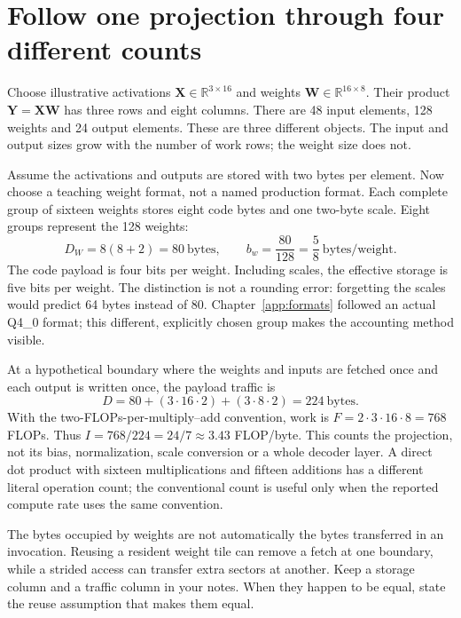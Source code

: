 \section{Follow one projection through four different counts}
Choose illustrative activations
$\mathbf X\in\mathbb R^{3\times16}$ and weights
$\mathbf W\in\mathbb R^{16\times8}$. Their product
$\mathbf Y=\mathbf X\mathbf W$ has three rows and eight columns.
There are 48 input elements, 128 weights and 24 output elements.
These are three different objects. The input and output sizes grow
with the number of work rows; the weight size does not.

Assume the activations and outputs are stored with two bytes per element.
Now choose a teaching weight format, not a named production format.
Each complete group of sixteen weights stores eight code bytes and
one two-byte scale. Eight groups represent the 128 weights:
\[
 D_W=8(8+2)=80\ \text{bytes},\qquad
 b_w=\frac{80}{128}=\frac58\ \text{bytes/weight}.
\]
The code payload is four bits per weight. Including scales, the effective
storage is five bits per weight. The distinction is not a rounding error:
forgetting the scales would predict 64 bytes instead of 80.
Chapter~\ref{app:formats} followed an actual Q4\_0 format; this different,
explicitly chosen group makes the accounting method visible.

At a hypothetical boundary where the weights and inputs are fetched once
and each output is written once, the payload traffic is
\[
 D=80+(3\cdot16\cdot2)+(3\cdot8\cdot2)
   =224\ \text{bytes}.
\]
With the two-FLOPs-per-multiply--add convention, work is
$F=2\cdot3\cdot16\cdot8=768$ FLOPs. Thus
$I=768/224=24/7\approx3.43$ FLOP/byte.
This counts the projection, not its bias, normalization, scale conversion
or a whole decoder layer. A direct dot product with sixteen multiplications
and fifteen additions has a different literal operation count;
the conventional count is useful only when the reported compute rate
uses the same convention.


The bytes occupied by weights are not automatically the bytes transferred
in an invocation. Reusing a resident weight tile can remove a fetch at
one boundary, while a strided access can transfer extra sectors at another.
Keep a storage column and a traffic column in your notes. When they happen
to be equal, state the reuse assumption that makes them equal.

